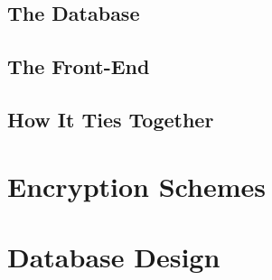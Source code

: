 		\subsection{The Database}

		\subsection{The Front-End}

		\subsection{How It Ties Together}

	\section{Encryption Schemes}
	\section{Database Design}
